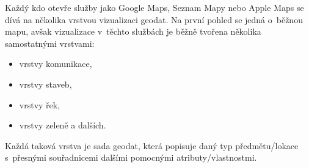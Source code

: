 Každý kdo otevře služby jako Google Maps, Seznam Mapy nebo Apple Maps se dívá na několika vrstvou vizualizaci geodat. Na první pohled se jedná o~běžnou mapu, avšak vizualizace v~těchto službách je běžně tvořena několika samostatnými vrstvami:

\begin{itemize}
  \item vrstvy komunikace,
  \item vrstvy staveb,
  \item vrstvy řek,
  \item vrstvy zeleně a dalších.
\end{itemize}

Každá taková vrstva je sada geodat, která popisuje daný typ předmětu/lokace s~přesnými souřadnicemi dalšími pomocnými atributy/vlastnostmi.

